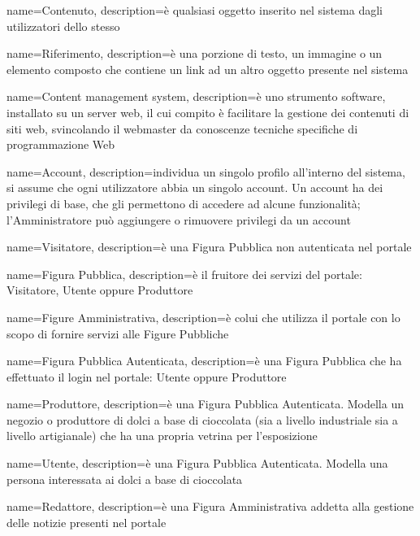 {
    name={Contenuto},
    description={è qualsiasi oggetto inserito nel sistema dagli utilizzatori dello stesso}
}

{
    name={Riferimento},
    description={è una porzione di testo, un immagine o un elemento composto che contiene un link ad un altro oggetto presente nel sistema}
}

{
    name={Content management system},
    description={è uno strumento software, installato su un server web, il cui
        compito è facilitare la gestione dei contenuti di siti web, svincolando il
        webmaster da conoscenze tecniche specifiche di programmazione Web}
}


{
    name={Account},
    description={individua un singolo profilo all'interno del sistema, si assume che ogni utilizzatore abbia un singolo account. Un account ha dei privilegi di base, che gli permettono di accedere ad alcune funzionalità; l'Amministratore può aggiungere o rimuovere privilegi da un account}
}

{
    name={Visitatore},
    description={è una Figura Pubblica non autenticata nel portale}
}

{
    name={Figura Pubblica},
    description={è il fruitore dei servizi del portale: Visitatore, Utente oppure Produttore}
}

{
    name={Figure Amministrativa},
    description={è colui che utilizza il portale con lo scopo di fornire servizi alle Figure Pubbliche}
}

{
    name={Figura Pubblica Autenticata},
    description={è una Figura Pubblica che ha effettuato il login nel portale: Utente oppure Produttore}
}

{
    name={Produttore},
    description={è una Figura Pubblica Autenticata. Modella un negozio o produttore di dolci a base di cioccolata (sia a livello industriale sia a livello artigianale) che ha una propria vetrina per l'esposizione}
}

{
    name={Utente},
    description={è una Figura Pubblica Autenticata. Modella una persona interessata ai dolci a base di cioccolata}
}

{
    name={Redattore},
    description={è una Figura Amministrativa addetta alla gestione delle notizie presenti nel portale}
}

